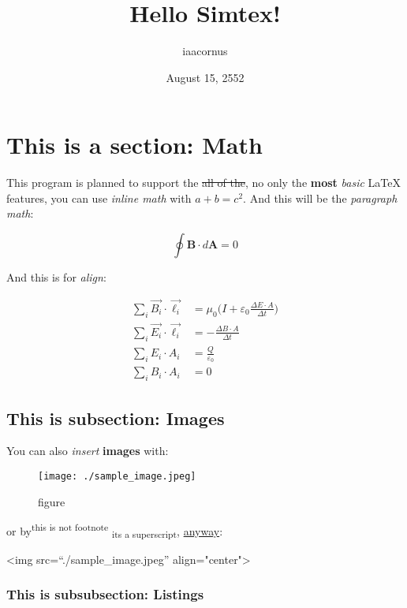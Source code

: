 \documentclass[12pt, UTF8]{article}
\title{Hello Simtex!}
\author{iaacornus}
\date{August 15, 2552}
\begin{document}
	\maketitle
	
	\section{This is a section: Math}
	
	This program is planned to support the \sout{all of the}, no only the \textbf{most} \textit{basic} \LaTeX{} features, you can use \emph{inline math} with $a + b = c^2$. And this will be the \emph{paragraph math}:
	
	\begin{equation}
		\oint \boldsymbol{B} \cdot d \boldsymbol{A} = 0
	\end{equation}
	
	And this is for \emph{align}:
	
	\begin{align}
		\sum_{i} \vec{B_{i}} \cdot \vec{\ell_{i}} &= \mu_{0} \bigg(I + \varepsilon_{0} \frac{\Delta E \cdot A}{\Delta t} \bigg)\\
		\sum_{i} \vec{E_{i}} \cdot \vec{\ell_{i}} &= - \frac{\Delta B \cdot A}{\Delta t}\\
		\sum_{i} E_{i} \cdot A_{i} &= \frac{Q}{\varepsilon_{0}}\\
		\sum_{i} B_{i} \cdot A_{i} &= 0
	\end{align}
	
	\subsection{This is subsection: Images}
	
	You can also \textit{insert} \textbf{images} with:
	
	\begin{figure}[h]
		\texttt{[image: ./sample\_image.jpeg]}
		\caption{figure}
	\end{figure}
	
	or by\textsuperscript{this is not footnote} \textsubscript{its a superscript}, \underline{anyway}:
	
	
	<img src=``./sample\_image.jpeg'' align="center">
	
	
	\subsubsection{This is subsubsection: Listings}
	
\end{document}
